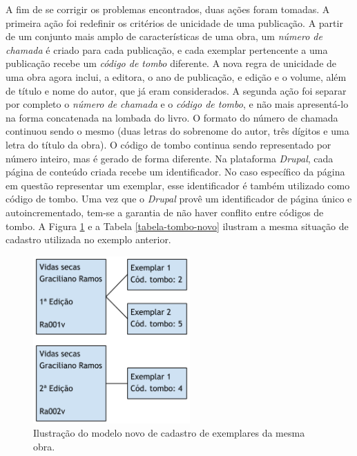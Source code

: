 \documentclass[a4paper]{article}
\begin{document}
A fim de se corrigir os problemas encontrados, duas ações foram tomadas. A primeira ação foi redefinir os critérios de unicidade de uma publicação. A partir de um conjunto mais amplo de características de uma obra, um \textit{número de chamada} é criado para cada publicação, e cada exemplar pertencente a uma publicação recebe um \textit{código de tombo} diferente. A nova regra de unicidade de uma obra agora inclui, a editora, o ano de publicação, e edição e o volume, além de título e nome do autor, que já eram considerados. A segunda ação foi separar por completo o \textit{número de chamada} e o \textit{código de tombo}, e não mais apresentá-lo na forma concatenada na lombada do livro. O formato do número de chamada continuou sendo o mesmo (duas letras do sobrenome do autor, três dígitos e uma letra do título da obra). O código de tombo continua sendo representado por número inteiro, mas é gerado de forma diferente. Na plataforma \textit{Drupal}, cada página de conteúdo criada recebe um identificador. No caso específico da página em questão representar um exemplar, esse identificador é também utilizado como código de tombo. Uma vez que o \textit{Drupal} provê um identificador de página único e autoincrementado, tem-se a garantia de não haver conflito entre códigos de tombo. A Figura \ref{tombo-novo} e a Tabela \ref{tabela-tombo-novo} ilustram a mesma situação de cadastro utilizada no exemplo anterior.

\begin{figure}[pbth!]
\centering
\includegraphics[width=60mm]{img/tombo-novo.png}
\caption{Ilustração do modelo novo de cadastro de exemplares da mesma obra.\label{tombo-novo}}
\end{figure}
\end{document}
